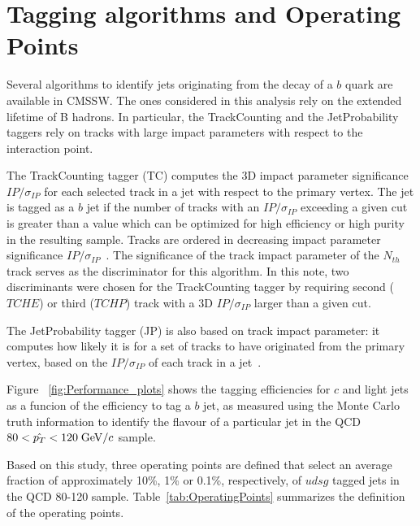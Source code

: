 \section{Tagging algorithms and Operating Points}
\label{sec:taggingalgos}
Several algorithms to identify jets originating from 
the decay of a $b$ quark are available in CMSSW. The ones considered in this 
analysis rely on the extended lifetime of B hadrons. In particular, the 
TrackCounting and the JetProbability taggers rely on tracks with large impact 
parameters with respect to the interaction point. 

The TrackCounting tagger (TC) computes the 3D impact parameter significance 
$IP/\sigma_{IP}$ for each selected track in a jet with respect to
the primary vertex. The jet is tagged as a 
$b$ jet if the number of tracks with an $IP/\sigma_{IP}$ exceeding a given 
cut is greater than a value which can be optimized for high efficiency or
high purity in the resulting sample. Tracks are ordered in decreasing 
impact parameter significance $IP/\sigma_{IP}$~\cite{ref:cmsip}. The significance of the track
impact parameter of the $N_{th} $ track serves as the discriminator for this 
algorithm.
In this note, two discriminants were chosen for the TrackCounting tagger by 
requiring second ($TCHE$) or third ($TCHP$) track with a 3D $IP/\sigma_{IP}$ 
larger than a given cut.

The JetProbability tagger (JP) is also based on track impact parameter:
it computes how likely it is for a set of tracks to have originated from the 
primary vertex, based on the $IP/\sigma_{IP}$ of each track in a jet~\cite{ref:cmsip}. 

Figure ~\ref{fig:Performance_plots} shows the tagging efficiencies for $c$ and 
light jets as a funcion of the efficiency to tag a $b$ jet, as measured  
using the Monte Carlo truth information to identify the flavour of a 
particular jet in the QCD $80<\hat{p_T}<120\;{\rm GeV}/c$ sample. 

Based on this study, three operating points are defined that select 
an average fraction of approximately 10\%, 1\% or 0.1\%, 
respectively, of $udsg$ tagged jets in the QCD 80-120 sample.
Table~\ref{tab:OperatingPoints} summarizes 
the definition of the operating points.

